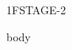 \documentclass[\mainfilename]{subfiles}
\begin{document}


\begin{sectionBox}1{FSTAGE-2} %
    
    body
    
\end{sectionBox}
\end{document}
